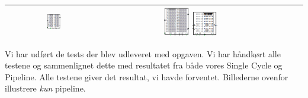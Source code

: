 \documentclass[12pt, a4paper]{article}
\begin{document}
\begin{center}
\begin{tabular}{| c | c | c | c | c | }
	\includegraphics[width=0.15\textwidth]{6-7-8.png} &
	\includegraphics[width=0.15\textwidth]{9.png}
	\includegraphics[width=0.15\textwidth]{s9.png}\\
    \hline
\end{tabular}

\end{center}

Vi har udført de tests der blev udleveret med opgaven. Vi har håndkørt alle testene og sammenlignet dette med resultatet fra både vores Single Cycle og Pipeline. Alle testene giver det resultat, vi havde forventet. Billederne ovenfor illustrere \textit{kun} pipeline.
\end{document}
